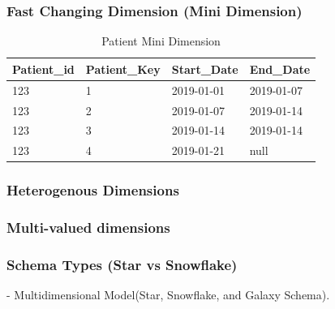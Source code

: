 \begin{frame}
	\frametitle{Fast Changing Dimension (Mini Dimension)}

\begin{table}
	\begin{adjustbox}{max width=.7\textwidth}
		\begin{tabular}{| l | l | l | l |}
			\hline
			Patient\_id & Patient\_Key & Start\_Date & End\_Date\\
			\hline
			\hline		
			123 & 1   & 2019-01-01 & 2019-01-07\\
			123 & 2   & 2019-01-07 & 2019-01-14\\
			123 & 3   & 2019-01-14 & 2019-01-14\\
			123 & 4   & 2019-01-21 & null\\
			\hline
		\end{tabular}
	\end{adjustbox}
	\caption{Patient Mini Dimension}
\end{table}

\end{frame}
\begin{frame}
	\frametitle{Heterogenous Dimensions}
	\begin{description}[<+->]
		\item[Heterogenous Dimensions]   
	\end{description}
\end{frame}


\begin{frame}
	\frametitle{Multi-valued dimensions}
	\begin{description}[<+->]
		\item[Multi-valued dimensions]   
	\end{description}
\end{frame}


\begin{frame}
    \frametitle{Schema Types (Star vs Snowflake)}
    - Multidimensional Model(Star, Snowflake, and Galaxy Schema).\\

\end{frame}

